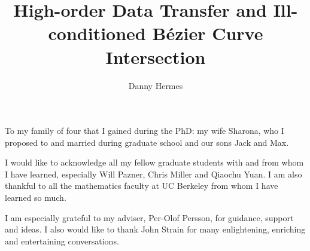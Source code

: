 \documentclass{ucbthesis}
\theoremstyle{definition}
\begin{document}

\title{High-order Data Transfer and
  Ill-conditioned B\'{e}zier Curve Intersection}
\author{Danny Hermes}

\maketitle
\approvalpage
\copyrightpage



\begin{frontmatter}

\begin{dedication}
\null\vfil
\begin{center}
To my family of four that I gained during the PhD: my wife Sharona, who
I proposed to and married during graduate school and our sons Jack and Max.
\end{center}
\vfil\null
\end{dedication}

\tableofcontents
\clearpage
\listoffigures
\clearpage
\listoftables

\begin{acknowledgements}
I would like to acknowledge all my fellow graduate students with and from
whom I have learned, especially Will Pazner, Chris Miller and
Qiaochu Yuan. I am also thankful to all the mathematics faculty
at UC Berkeley from whom I have learned so much.

I am especially grateful to my adviser, Per-Olof Persson, for guidance,
support and ideas. I also would like to thank John Strain for many
enlightening, enriching and entertaining conversations.
\end{acknowledgements}

\end{frontmatter}

\pagestyle{headings}











\appendix



\end{document}
